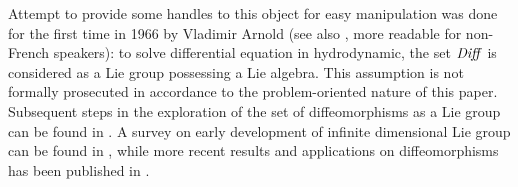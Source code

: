 Attempt to provide some handles to this object for easy manipulation was done for the first time in 1966 by Vladimir Arnold \cite{arnold1966geometrie} (see also \cite{arnold1998topological}, more readable for non-French speakers): to solve differential equation in hydrodynamic, the set $\text{\emph{Diff}}$ is considered as a Lie group possessing a Lie algebra. This assumption is not formally prosecuted in accordance to the problem-oriented nature of this paper. Subsequent steps in the exploration of the set of diffeomorphisms as a Lie group can be found in \cite{marsden1970hamiltonian, ebin1970groups, omori1970group, leslie1983lie}. A survey on early development of infinite dimensional Lie group can be found in \cite{Milnor:84:remarks}, while more recent results and applications on diffeomorphisms has been published in \cite{ovsienko1992integrals, bauer2010sobolev,schmid2010infinite,  bauer2011geodesic}.\\


